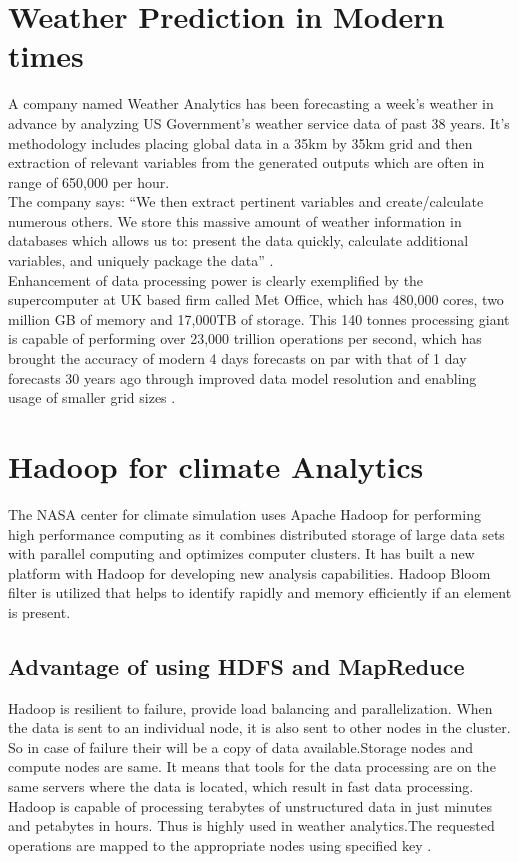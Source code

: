 \documentclass[sigconf]{acmart}
\begin{document}
\section{Weather Prediction in Modern times}

A company named Weather Analytics has been forecasting a week's weather in advance by analyzing US Government's weather service data of past 38 years. It's methodology includes placing global data in a 35km by 35km grid and then extraction of relevant variables from the generated outputs which are often in range of 650,000 per hour.\\

The company says: ``We then extract pertinent variables and create/calculate numerous others. We store this massive amount of weather information in databases which allows us to: present the data quickly, calculate additional variables, and uniquely package the data'' \cite{Zdnet}.\\

Enhancement of data processing power is clearly exemplified by the supercomputer at UK based firm called Met Office, which has 480,000 cores, two million GB of memory and 17,000TB of storage. This 140 tonnes processing giant is capable of performing over 23,000 trillion operations per second, which has brought the accuracy of modern 4 days forecasts on par with that of 1 day forecasts 30 years ago through improved data model resolution and enabling usage of smaller grid sizes \cite{Zdnet}.

\section{Hadoop for climate Analytics}

The NASA center for climate simulation uses Apache Hadoop for performing high performance computing as it combines distributed storage of large data sets with parallel computing and optimizes computer clusters. It has built a new platform with Hadoop for developing new analysis capabilities. Hadoop Bloom filter is utilized that helps to identify rapidly and memory efficiently if an element is present.\\


\subsection*{Advantage of using HDFS and MapReduce}

Hadoop is resilient to failure, provide load balancing and parallelization. When the data is sent to an individual node, it is also sent to other nodes in the cluster. So in case of failure their will be a copy of data available.Storage nodes and compute nodes are same. It means that tools for the data processing are on the same servers where the data is located, which result in fast data processing. Hadoop is capable of processing terabytes of unstructured data in just minutes and petabytes in hours. Thus is highly used in weather analytics.The requested operations are mapped to the appropriate nodes using specified key \cite{Hadoop01}. \\
\end{document}
